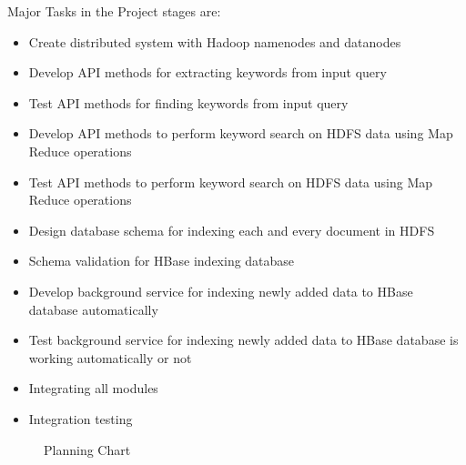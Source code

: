 \documentclass[oneside,a4paper,12pt]{report}
\begin{document}
{\begin{appendices}
Major Tasks in the Project stages are: 
\begin{itemize}
\item Create distributed system with Hadoop namenodes and datanodes
\item Develop API methods for extracting keywords from input query
\item Test API methods for finding keywords from input query
\item Develop API methods to perform keyword search on HDFS data using Map Reduce operations
\item Test API methods to perform keyword search on HDFS data using Map Reduce operations
\item Design database schema for indexing each and every document in HDFS
\item Schema validation for HBase indexing database
\item Develop background service for indexing newly added data to HBase database automatically
\item Test background service for indexing newly added data to HBase database is working automatically or not
\item Integrating all modules
\item Integration testing
\end{itemize}

\begin{center}
	\begin{figure}[!htbp]
		\centering
	  \caption{Planning Chart}
	  \label{fig:usecase}
	\end{figure}
\end{center}  





\end{appendices}}
\end{document}
